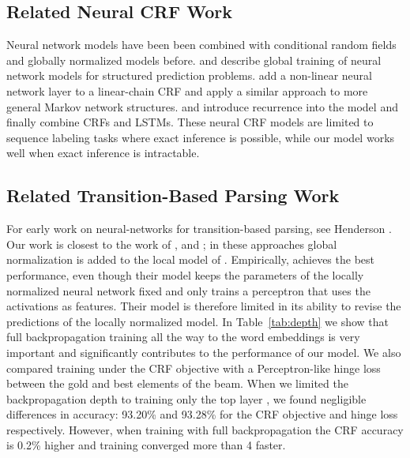 \documentclass[11pt]{article}
\begin{document}
\subsection{Related Neural CRF Work}

Neural network models have been been combined with 
conditional random fields and globally normalized models before.
 and  describe global training of
neural network models for structured prediction problems.
 add a non-linear neural
network layer to a linear-chain CRF and
 apply a similar approach
to more general Markov network structures.
 and 
introduce recurrence into the model and
 finally combine
CRFs and LSTMs.
These neural CRF models are limited to
sequence labeling tasks where exact inference is possible,
while our model works well when exact inference is intractable.


\subsection{Related Transition-Based Parsing Work}

For early work on neural-networks for transition-based parsing,
see Henderson .
Our work is closest to the work of
, 
and ;
in these approaches global normalization is added to the
local model of .
Empirically, 
achieves the best performance, even though
their model keeps the parameters of the locally
normalized neural network fixed and only
trains a perceptron that uses the activations as features.
Their model is therefore limited in its ability to
revise the predictions of the locally normalized model.
In Table~\ref{tab:depth} we show that full backpropagation
training all the way to the word embeddings
is very important and significantly contributes
to the performance of our model.
We also compared training under the CRF objective with a 
Perceptron-like hinge loss between the gold and best elements of the beam.
When we limited the backpropagation depth to training only the top layer ,
we found negligible differences in accuracy:
93.20\% and 93.28\% for the CRF objective and hinge loss respectively.
However, when training with full backpropagation the CRF accuracy 
is 0.2\% higher and training converged more than 4
faster.
\end{document}
